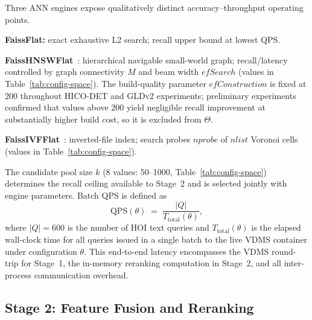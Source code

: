 \documentclass[sigconf, nonacm]{acmart}
\theoremstyle{definition}
\begin{document}
Three ANN engines expose qualitatively distinct accuracy--throughput operating points.

\noindent\textbf{FaissFlat:} exact exhaustive L2 search; recall upper bound at lowest QPS.

\noindent\textbf{FaissHNSWFlat}~\cite{malkov2020hnsw}: hierarchical navigable small-world graph; recall/latency controlled by graph connectivity $M$ and beam width $\mathit{efSearch}$ (values in Table~\ref{tab:config-space}).
The build-quality parameter $\mathit{efConstruction}$ is fixed at $200$ throughout HICO-DET and GLDv2 experiments; preliminary experiments confirmed that values above $200$ yield negligible recall improvement at substantially higher build cost, so it is excluded from $\Theta$.

\noindent\textbf{FaissIVFFlat}~\cite{johnson2021billion}: inverted-file index; search probes $\mathit{nprobe}$ of $\mathit{nlist}$ Voronoi cells (values in Table~\ref{tab:config-space}).

The candidate pool size $k$ (8 values: 50--1000, Table~\ref{tab:config-space}) determines
the recall ceiling available to Stage~2 and is selected jointly with engine parameters.
Batch QPS is defined as
\begin{equation}
  \mathrm{QPS}(\theta) \;=\; \frac{|Q|}{T_{\mathrm{total}}(\theta)} ,
  \label{eq:qps}
\end{equation}
where $|Q|{=}600$ is the number of HOI text queries and $T_{\mathrm{total}}(\theta)$
is the elapsed wall-clock time for all queries issued in a single batch to the live
VDMS container under configuration $\theta$.
This end-to-end latency encompasses the VDMS round-trip for Stage~1, the in-memory
reranking computation in Stage~2, and all inter-process communication overhead.

\subsection{Stage 2: Feature Fusion and Reranking}
\label{sec:stage2}
\end{document}
